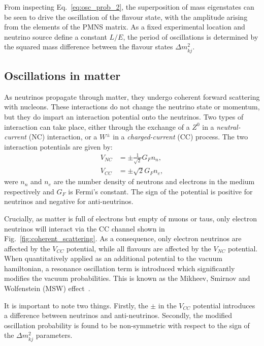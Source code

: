 From inspecting Eq.~\ref{eq:osc_prob_2}, the superposition of mass eigenstates can be seen to
drive the oscillation of the flavour state, with the amplitude arising from the elements of the
PMNS matrix. As a fixed experimental location and neutrino source define a constant $L/E$, the
period of oscillations is determined by the squared mass difference between the flavour states
$\Delta m_{kj}^{2}$.

\subsection{Oscillations in matter} %
\label{sec:theory_oscillations_matter} %

As neutrinos propagate through matter, they undergo coherent forward scattering with nucleons.
These interactions do not change the neutrino state or momentum, but they do impart an interaction
potential onto the neutrinos. Two types of interaction can take place, either through the exchange
of a $Z^{0}$ in a \emph{neutral-current} (NC) interaction, or a $W^{\pm}$ in a
\emph{charged-current} (CC) process. The two interaction potentials are given by:
\begin{align} %
    V_{NC} & = \pm\frac{1}{\sqrt{2}}G_{F}n_{n}, \\
    V_{CC} & = \pm\sqrt{2}G_{F}n_{e},
\end{align}
were $n_{n}$ and $n_{e}$ are the number density of neutrons and electrons in the medium
respectively and $G_{F}$ is Fermi's constant. The sign of the potential is positive for neutrinos
and negative for anti-neutrinos.

Crucially, as matter is full of electrons but empty of muons or taus, only electron neutrinos will
interact via the CC channel shown in Fig.~\ref{fig:coherent_scattering}. As a consequence, only
electron neutrinos are affected by the $V_{CC}$ potential, while all flavours are affected by the
$V_{NC}$ potential. When quantitatively applied as an additional potential to the vacuum
hamiltonian, a resonance oscillation term is introduced which significantly modifies the vacuum
probabilities. This is known as the Mikheev, Smirnov and Wolfenstein (MSW)
effect~\cite{wolfenstein1978, mikheev1986}.

It is important to note two things. Firstly, the $\pm$ in the $V_{CC}$ potential introduces a
difference between neutrinos and anti-neutrinos. Secondly, the modified oscillation probability is
found to be non-symmetric with respect to the sign of the $\Delta m_{kj}^{2}$ parameters.

